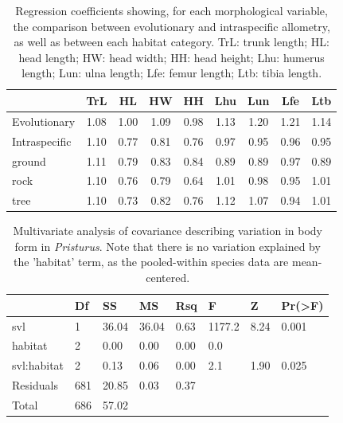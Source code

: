 \documentclass[
  11pt,
]{article}
\begin{document}
\begin{table}[H]

\caption{\label{tab:unnamed-chunk-1}Regression coefficients showing, for each morphological variable, the comparison between evolutionary and intraspecific allometry, as well as between each habitat category. TrL: trunk length; HL: head length; HW: head width; HH: head height; Lhu: humerus length; Lun: ulna length; Lfe: femur length; Ltb: tibia length.}
\centering
\begin{tabular}[t]{lcccccccc}
\toprule
  & TrL & HL & HW & HH & Lhu & Lun & Lfe & Ltb\\
\midrule
Evolutionary & 1.08 & 1.00 & 1.09 & 0.98 & 1.13 & 1.20 & 1.21 & 1.14\\
Intraspecific & 1.10 & 0.77 & 0.81 & 0.76 & 0.97 & 0.95 & 0.96 & 0.95\\
\midrule
ground & 1.11 & 0.79 & 0.83 & 0.84 & 0.89 & 0.89 & 0.97 & 0.89\\
rock & 1.10 & 0.76 & 0.79 & 0.64 & 1.01 & 0.98 & 0.95 & 1.01\\
tree & 1.10 & 0.73 & 0.82 & 0.76 & 1.12 & 1.07 & 0.94 & 1.01\\
\bottomrule
\end{tabular}
\end{table}

\newpage

\begin{table}[H]

\caption{\label{tab:unnamed-chunk-2}Multivariate analysis of covariance describing variation in body form in \textit{Pristurus}. Note that there is no variation explained by the 'habitat' term, as the pooled-within species data are mean-centered.}
\centering
\begin{tabular}[t]{llllllll}
\toprule
  & Df & SS & MS & Rsq & F & Z & Pr(>F)\\
\midrule
svl & 1 & 36.04 & 36.04 & 0.63 & 1177.2 & 8.24 & 0.001\\
habitat & 2 & 0.00 & 0.00 & 0.00 & 0.0 &  & \\
svl:habitat & 2 & 0.13 & 0.06 & 0.00 & 2.1 & 1.90 & 0.025\\
Residuals & 681 & 20.85 & 0.03 & 0.37 &  &  & \\
Total & 686 & 57.02 &  &  &  &  & \\
\bottomrule
\end{tabular}
\end{table}
\end{document}

